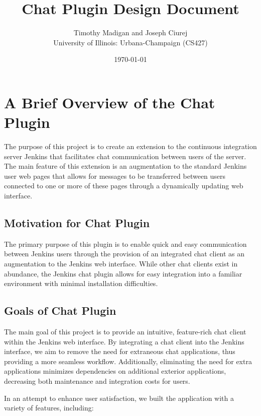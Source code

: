 \documentclass{article}
\begin{document}
	\title{Chat Plugin Design Document}
	\author{Timothy Madigan and Joseph Ciurej \\
		University of Illinois: Urbana-Champaign (CS427)}
	\date{\today}
	\maketitle

	\tableofcontents
	\clearpage

	\section[Plugin Overview]{A Brief Overview of the Chat Plugin}
	The purpose of this project is to create an extension to the continuous 
	integration server Jenkins that facilitates chat communication between
	users of the server.  The main feature of this extension is an augmentation
	to the standard Jenkins user web pages that allows for messages to be 
	transferred between users connected to one or more of these pages through
	a dynamically updating web interface.

		\subsection[Motiviation]{Motivation for Chat Plugin}
		The primary purpose of this plugin is to enable quick and easy 
		communication between Jenkins users through the provision of an 
		integrated chat client as an augmentation to the Jenkins web interface.
		While other chat clients exist in abundance, the Jenkins chat plugin
		allows for easy integration into a familiar environment with minimal
		installation difficulties.

		\subsection[Project Goals]{Goals of Chat Plugin}
		The main goal of this project is to provide an intuitive, feature-rich
		chat client within the Jenkins web interface.  By integrating a chat client
		into the Jenkins interface, we aim to remove the need for extraneous chat 
		applications, thus providing a more seamless workflow.  Additionally,
		eliminating the need for extra applications minimizes dependencies on
		additional exterior applications, decreasing both maintenance and
		integration costs for users.

		In an attempt to enhance user satisfaction, we built the application with
		a variety of features, including:
\end{document}
